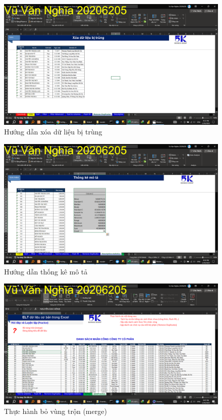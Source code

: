 \documentclass{article}
\begin{document}
\begin{figure}[H]
\centering
\includegraphics[scale = 0.15]{Video1/HuongDan/12.png}
\caption{Hướng dẫn xóa dữ liệu bị trùng}
\end{figure}

\begin{figure}[H]
\centering
\includegraphics[scale = 0.15]{Video1/HuongDan/13.png}
\caption{Hướng dẫn thống kê mô tả}
\end{figure}
\begin{figure}[H]
\centering
\includegraphics[scale = 0.15]{Video1/ThucHanh/1.png}
\caption{Thực hành bỏ vùng trộn (merge)}
\end{figure}
\end{document}
